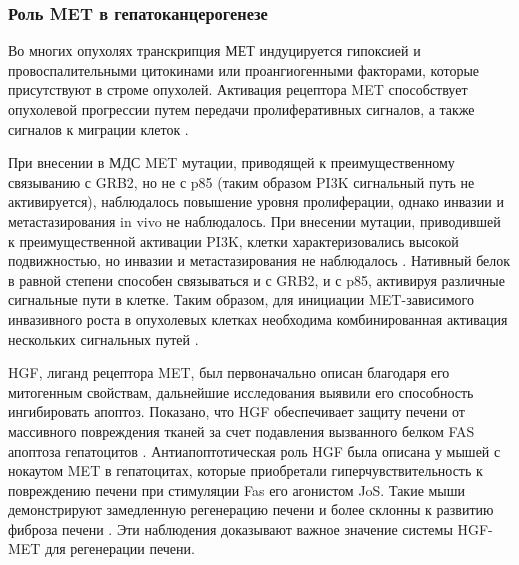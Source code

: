 \subsubsection{Роль MET в гепатоканцерогенезе}

Во многих опухолях транскрипция МЕТ индуцируется гипоксией и провоспалительными цитокинами или проангиогенными факторами, которые присутствуют в строме опухолей. Активация рецептора MET способствует опухолевой прогрессии путем передачи пролиферативных сигналов, а также сигналов к миграции клеток \cite{pennacchietti_hypoxia_2003, bhowmick_stromal_2004}.

При внесении в МДС MET мутации, приводящей к преимущественному связыванию с GRB2, но не с p85 (таким образом PI3K сигнальный путь не активируется), наблюдалось повышение уровня пролиферации, однако инвазии и метастазирования in vivo не наблюдалось. При внесении мутации, приводившей к преимущественной активации PI3K, клетки характеризовались высокой подвижностью, но инвазии и метастазирования не наблюдалось \cite{giordano_point_1997, bardelli_concomitant_1999}. Нативный белок в равной степени способен связываться и с GRB2, и с p85, активируя различные сигнальные пути в клетке. Таким образом, для инициации MET-зависимого инвазивного роста в опухолевых клетках необходима комбинированная активация нескольких сигнальных путей \cite{trusolino_met_2010}. 

HGF, лиганд рецептора MET, был первоначально описан благодаря его митогенным свойствам, дальнейшие исследования выявили его способность ингибировать апоптоз. Показано, что HGF обеспечивает защиту печени от массивного повреждения тканей  за счет подавления вызванного белком FAS апоптоза гепатоцитов \cite{kosai_abrogation_1998}. Антиапоптотическая роль HGF была описана у мышей с нокаутом MET в гепатоцитах, которые приобретали гиперчувствительность к повреждению печени при стимуляции Fas его агонистом JoS. Такие мыши демонстрируют замедленную регенерацию печени и более склонны к развитию фиброза печени \cite{giebeler_c-met_2009}. Эти наблюдения доказывают важное значение системы HGF-MET для регенерации печени.


